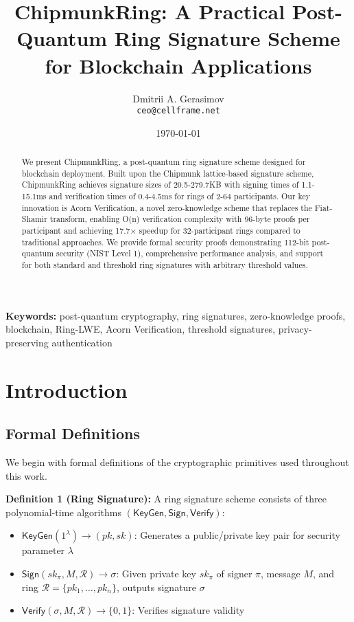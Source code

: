 \documentclass[11pt,a4paper]{article}
\title{ChipmunkRing: A Practical Post-Quantum Ring Signature Scheme for Blockchain Applications}
\author{
Dmitrii A. Gerasimov\\
\texttt{ceo@cellframe.net}
}
\date{\today}
\begin{document}
\maketitle

\begin{abstract}
We present ChipmunkRing, a post-quantum ring signature scheme designed for blockchain deployment. Built upon the Chipmunk lattice-based signature scheme, ChipmunkRing achieves signature sizes of 20.5-279.7KB with signing times of 1.1-15.1ms and verification times of 0.4-4.5ms for rings of 2-64 participants. Our key innovation is Acorn Verification, a novel zero-knowledge scheme that replaces the Fiat-Shamir transform, enabling O(n) verification complexity with 96-byte proofs per participant and achieving 17.7× speedup for 32-participant rings compared to traditional approaches. We provide formal security proofs demonstrating 112-bit post-quantum security (NIST Level 1), comprehensive performance analysis, and support for both standard and threshold ring signatures with arbitrary threshold values.
\end{abstract}

\noindent\textbf{Keywords:} post-quantum cryptography, ring signatures, zero-knowledge proofs, blockchain, Ring-LWE, Acorn Verification, threshold signatures, privacy-preserving authentication

\section{Introduction}

\subsection{Formal Definitions}

We begin with formal definitions of the cryptographic primitives used throughout this work.

\textbf{Definition 1 (Ring Signature):} A ring signature scheme consists of three polynomial-time algorithms $(\mathsf{KeyGen}, \mathsf{Sign}, \mathsf{Verify})$:
\begin{itemize}
\item $\mathsf{KeyGen}(1^\lambda) \rightarrow (pk, sk)$: Generates a public/private key pair for security parameter $\lambda$
\item $\mathsf{Sign}(sk_\pi, M, \mathcal{R}) \rightarrow \sigma$: Given private key $sk_\pi$ of signer $\pi$, message $M$, and ring $\mathcal{R} = \{pk_1, \ldots, pk_n\}$, outputs signature $\sigma$
\item $\mathsf{Verify}(\sigma, M, \mathcal{R}) \rightarrow \{0,1\}$: Verifies signature validity
\end{itemize}
\end{document}
